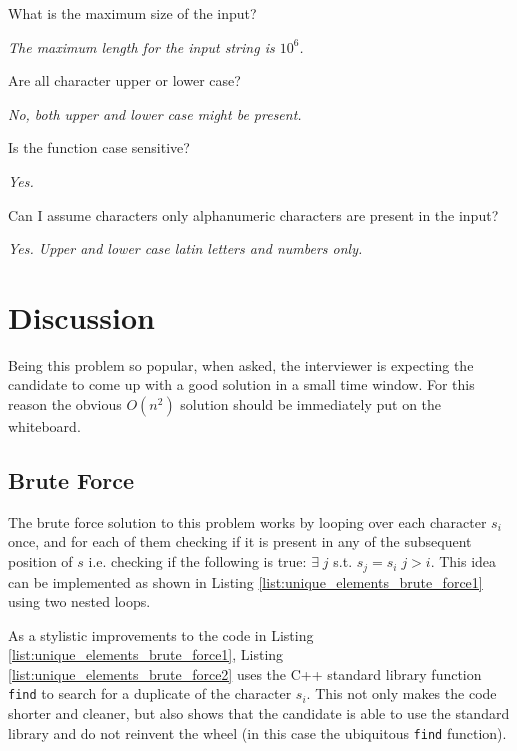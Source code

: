 \begin{QandA}
	\item What is the maximum size of the input?
	\begin{answered}
		\textit{The maximum length for the input string is $10^6$.}
	\end{answered}
	
	\item Are all character upper or lower case?
	\begin{answered}
		\textit{No, both upper and lower case might be present.}
	\end{answered}

	\item Is the function case sensitive?
	\begin{answered}
		\textit{Yes.}
	\end{answered}

	\item Can I assume characters only alphanumeric characters are present in the input?
	\begin{answered}
		\textit{Yes. Upper and lower case latin letters and numbers only.}
	\end{answered}
\end{QandA}

\section{Discussion}
Being this problem so popular, when asked, the interviewer is expecting the candidate to come up with a good solution in a small time window. For this reason the obvious $O(n^2)$ solution should be immediately put on the whiteboard.
\subsection{Brute Force}
The brute force solution to this problem works by looping over each character $s_i$ once, and for each of them checking if it is present in any of the subsequent position of $s$ i.e. checking if the following is true: $\exists \; j $ s.t.  $s_j=s_i \; j>i$.
This idea can be implemented as shown in Listing \ref{list:unique_elements_brute_force1} using two nested loops.


	


As a stylistic improvements to the code in Listing \ref{list:unique_elements_brute_force1}, Listing \ref{list:unique_elements_brute_force2}  uses the C++ standard library function \texttt{find} to search for a duplicate  of the character $s_i$. This not only makes the code shorter and cleaner, but also shows that the candidate is able to use the standard library and do not reinvent the wheel (in this case the ubiquitous \texttt{find} function).


